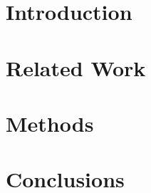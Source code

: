 \documentclass{thesis}
\begin{document}
\maketitle





\thesisTables
\thesisBodyStart

\chapter{Introduction}


\chapter{Related Work}


\chapter{Methods}


\chapter{Conclusions}


\printReferences
\end{document}
